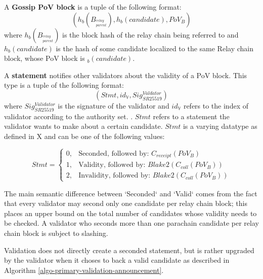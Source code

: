 \begin{definition}
  \label{defn-pov-block}
  A \textbf{Gossip PoV block} is a tuple of the following format:
  \[
  (h_b(B_{^{relay}_{parent}}), h_b(candidate), PoV_B)
  \]
  where $h_b(B_{^{relay}_{parent}})$ is the block hash of the relay chain being
  referred to and $h_b(candidate)$ is the hash of some candidate localized to
  the same Relay chain block, whose PoV block is $_b(candidate)$.
\end{definition}

\begin{definition}
  \label{defn-gossip-statement}
  A \textbf{statement} notifies other validators about the validity of a PoV block.
  This type is a tuple of the following format:
  \[
  (Stmt, id_{\mathbb{V}}, Sig^{Valdator}_{SR25519})
  \]
  where $Sig^{Validator}_{SR25519}$ is the signature of the validator and
  $id_{\mathbb{V}}$ refers to the index of validator according to the authority
  set. . $Stmt$
  refers to a statement the validator wants to make about a certain candidate.
  $Stmt$ is a varying datatype as defined in X  and can be one
  of the following values:

  \begin{equation*}
    Stmt =
    \begin{cases}
      0, & \text{Seconded, followed by: } C_{receipt}(PoV_B) \\
      1, & \text{Validity, followed by: } Blake2(C_{coll}(PoV_B)) \\
      2, & \text{Invalidity, followed by: } Blake2(C_{coll}(PoV_B))
    \end{cases}
  \end{equation*}

  The main semantic difference between `Seconded` and `Valid` comes from the fact
  that every validator may second only one candidate per relay chain block; this
  places an upper bound on the total number of candidates whose validity needs to
  be checked. A validator who seconds more than one parachain candidate per relay
  chain block is subject to slashing.
  \newline

  Validation does not directly create a seconded statement, but is rather upgraded
  by the validator when it choses to back a valid candidate as described in
  Algorithm \ref{algo-primary-validation-announcement}.
\end{definition}

